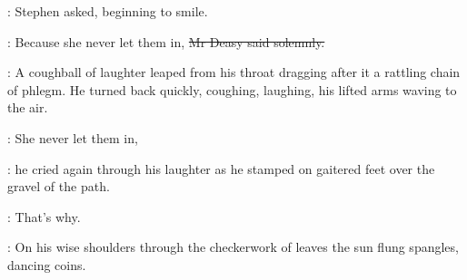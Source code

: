 :
Stephen asked, beginning to smile.

\deasy:
Because she never let them in,
\sout{Mr Deasy said solemnly.}

:
A coughball of laughter leaped from his throat
dragging after it a rattling chain of phlegm.
He turned back quickly, coughing, laughing,
his lifted arms waving to the air.

\deasy:
She never let them in,

:
he cried again through his laughter
as he stamped on gaitered feet over the gravel of the path.

\deasy:
That's why.

:
On his wise shoulders through the checkerwork of leaves
the sun flung spangles, dancing coins.

